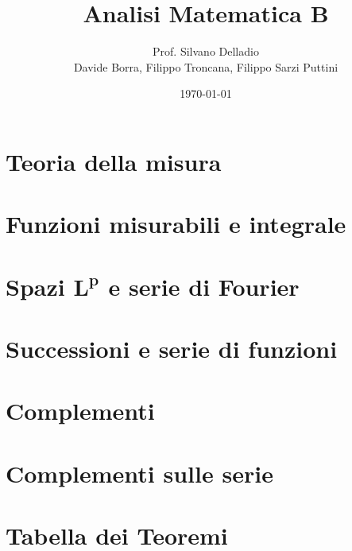 \documentclass{book}
\title{
  Analisi Matematica B}
\author{Prof. Silvano Delladio\\\small Davide Borra, Filippo Troncana, Filippo Sarzi Puttini}
\date{\today}
\begin{document}
\chapter{Teoria della misura}\label{ch: 1}

\chapter{Funzioni misurabili e integrale}\label{ch: 2}
%
\chapter[Spazi $L^p$ e serie di Fourier]{Spazi $\boldsymbol L^{\boldsymbol p}$ e serie di Fourier}\label{ch: 3}
%
\chapter{Successioni e serie di funzioni}\label{ch: 4}
%
\chapter{Complementi}\label{ch: 5}
%
\appendix
\chapter{Complementi sulle serie}
%
\chapter{Tabella dei Teoremi}
%
\end{document}
